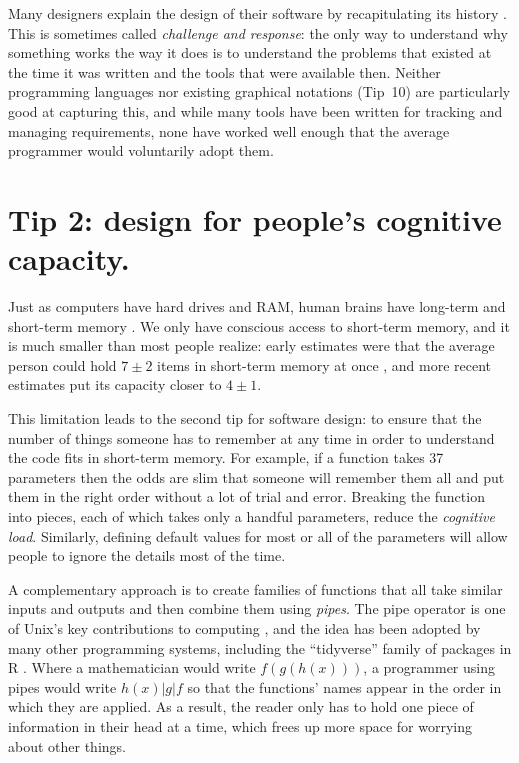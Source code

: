 \documentclass[10pt,letterpaper]{article}
\begin{document}
\begin{mdframed}
  \noindent
  Many designers explain the design of their software
  by recapitulating its history \cite{Brown2011,Brown2012}.
  This is sometimes called \emph{challenge and response}:
  the only way to understand why something works the way it does
  is to understand the problems that existed at the time it was written
  and the tools that were available then.
  Neither programming languages nor existing graphical notations (Tip~10)
  are particularly good at capturing this,
  and while many tools have been written for tracking and managing requirements,
  none have worked well enough that the average programmer would voluntarily adopt them.
\end{mdframed}

\section*{Tip 2: design for people's cognitive capacity.}

Just as computers have hard drives and RAM,
human brains have long-term and short-term memory \cite{Hermans2021}.
We only have conscious access to short-term memory,
and it is much smaller than most people realize:
early estimates were that the average person could hold
$7{\pm}2$ items in short-term memory at once \cite{Miller1956},
and more recent estimates put its capacity closer to $4{\pm}1$.

This limitation leads to the second tip for software design:
to ensure that the number of things someone has to remember at any time
in order to understand the code
fits in short-term memory.
For example,
if a function takes 37 parameters
then the odds are slim
that someone will remember them all and put them in the right order
without a lot of trial and error.
Breaking the function into pieces,
each of which takes only a handful parameters,
reduce the \emph{cognitive load}.
Similarly,
defining default values for most or all of the parameters
will allow people to ignore the details most of the time.

A complementary approach is to create families of functions
that all take similar inputs and outputs
and then combine them using \emph{pipes}.
The pipe operator is one of Unix's key contributions to computing \cite{Kernighan2019},
and the idea has been adopted by many other programming systems,
including the ``tidyverse'' family of packages in R \cite{Wickham2017}.
Where a mathematician would write $f(g(h(x)))$,
a programmer using pipes would write $h(x) | g | f$
so that the functions' names appear in the order in which they are applied.
As a result,
the reader only has to hold one piece of information in their head at a time,
which frees up more space for worrying about other things.
\end{document}
